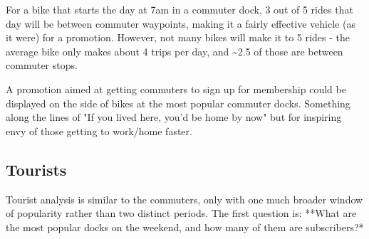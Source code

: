 \documentclass[11pt]{article}
\begin{document}
For a bike that starts the day at 7am in a commuter dock, 3 out of 5
rides that day will be between commuter waypoints, making it a fairly
effective vehicle (as it were) for a promotion. However, not many bikes
will make it to 5 rides - the average bike only makes about 4 trips per
day, and \textasciitilde{}2.5 of those are between commuter stops.

A promotion aimed at getting commuters to sign up for membership could
be displayed on the side of bikes at the most popular commuter docks.
Something along the lines of "If you lived here, you'd be home by now"
but for inspiring envy of those getting to work/home faster.

    \subsection{Tourists}\label{tourists}

Tourist analysis is similar to the commuters, only with one much broader
window of popularity rather than two distinct periods. The first
question is: **What are the most popular docks on the weekend, and how
many of them are subscribers?*
\end{document}
